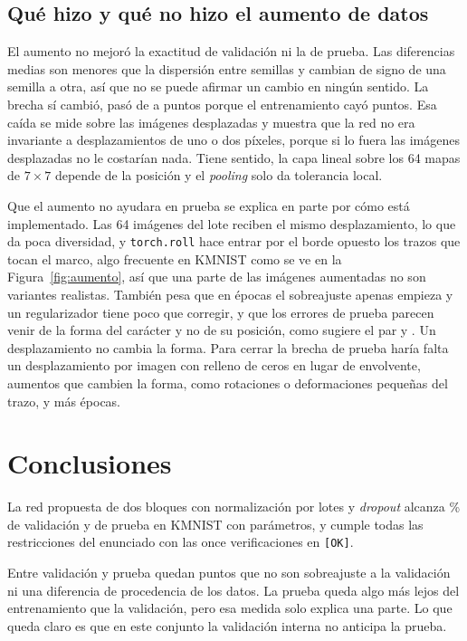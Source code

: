 \documentclass[11pt,letterpaper]{article}
\begin{document}
\subsection{Qué hizo y qué no hizo el aumento de datos}

El aumento no mejoró la exactitud de validación ni la de prueba. Las diferencias medias son menores que la dispersión entre semillas y cambian de signo de una semilla a otra, así que no se puede afirmar un cambio en ningún sentido. La brecha sí cambió, pasó de \augBrechaSin{} a \augBrechaCon{} puntos porque el entrenamiento cayó \augDifTrAbs{} puntos. Esa caída se mide sobre las imágenes desplazadas y muestra que la red no era invariante a desplazamientos de uno o dos píxeles, porque si lo fuera las imágenes desplazadas no le costarían nada. Tiene sentido, la capa lineal sobre los 64 mapas de $7\times7$ depende de la posición y el \emph{pooling} solo da tolerancia local.

Que el aumento no ayudara en prueba se explica en parte por cómo está implementado. Las 64 imágenes del lote reciben el mismo desplazamiento, lo que da poca diversidad, y \texttt{torch.roll} hace entrar por el borde opuesto los trazos que tocan el marco, algo frecuente en KMNIST como se ve en la Figura~\ref{fig:aumento}, así que una parte de las imágenes aumentadas no son variantes realistas. También pesa que en \epocas{} épocas el sobreajuste apenas empieza y un regularizador tiene poco que corregir, y que los errores de prueba parecen venir de la forma del carácter y no de su posición, como sugiere el par \parReal{} y \parPred. Un desplazamiento no cambia la forma. Para cerrar la brecha de prueba haría falta un desplazamiento por imagen con relleno de ceros en lugar de envolvente, aumentos que cambien la forma, como rotaciones o deformaciones pequeñas del trazo, y más épocas.

\section{Conclusiones}

La red propuesta de dos bloques con normalización por lotes y \emph{dropout} alcanza \vaccZ{} \% de validación y \accTe{} de prueba en KMNIST con \nPar{} parámetros, y cumple todas las restricciones del enunciado con las once verificaciones en \texttt{[OK]}.

Entre validación y prueba quedan \brecha{} puntos que no son sobreajuste a la validación ni una diferencia de procedencia de los datos. La prueba queda algo más lejos del entrenamiento que la validación, pero esa medida solo explica una parte. Lo que queda claro es que en este conjunto la validación interna no anticipa la prueba.
\end{document}
